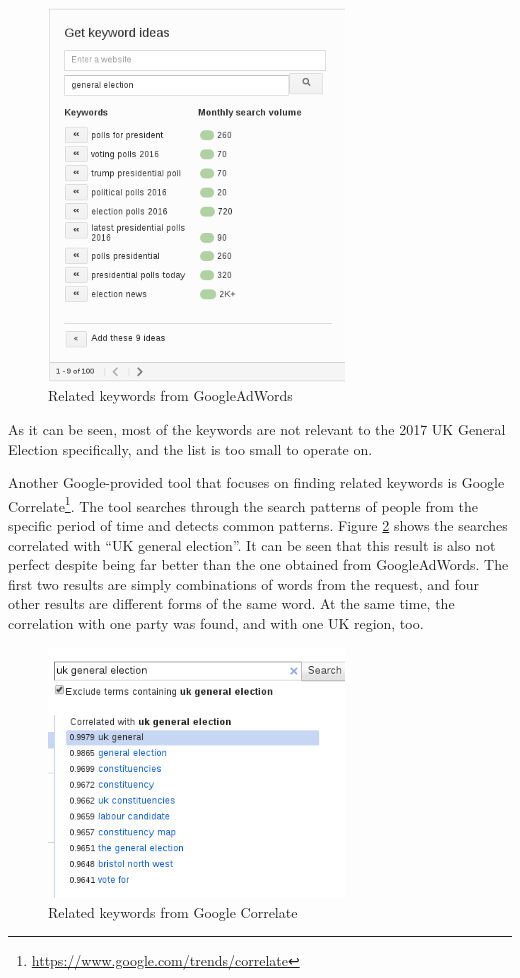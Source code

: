 \begin{figure}[ht]
\includegraphics[width=0.7\textwidth]{googleads}
\caption{Related keywords from GoogleAdWords}
\label{fig:googleads}
\end{figure}

As it can be seen, most of the keywords are not relevant to the 2017 UK General Election specifically, and the list is too small to operate on.

Another Google-provided tool that focuses on finding related keywords is Google Correlate\footnote{\url{https://www.google.com/trends/correlate}}. The tool searches through the search patterns of people from the specific period of time and detects common patterns. Figure \ref{fig:googlecorrelation} shows the searches correlated with ``UK general election''. It can be seen that this result is also not perfect despite being far better than the one obtained from GoogleAdWords. The first two results are simply combinations of words from the request, and four other results are different forms of the same word. At the same time, the correlation with one party was found, and with one UK region, too.

\begin{figure}[ht]
\includegraphics[width=0.7\textwidth]{googlecorrelation}
\caption{Related keywords from Google Correlate}
\label{fig:googlecorrelation}
\end{figure}

